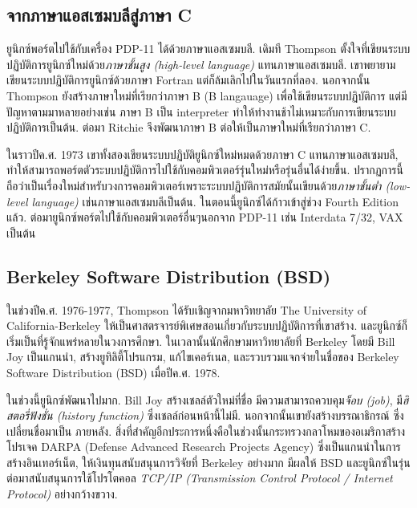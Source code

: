 \begin{thwbr}
{{\subsection{จากภาษาแอสเซมบลีสู่ภาษา C}
ยูนิกซ์พอร์ตไปใช้กับเครื่อง PDP-11 ได้ด้วยภาษาแอสเซมบลี. เดิมที Thompson ตั้งใจที่เขียนระบบปฏิบัติการยูนิกซ์ใหม่ด้วย{\em ภาษาชั้นสูง (high-level language)} แทนภาษาแอสเซมบลี. เขาพยายามเขียนระบบปฏิบัติการยูนิกซ์ด้วยภาษา Fortran แต่ก็ล้มเลิกไปในวันแรกที่ลอง. นอกจากนั้น Thompson ยังสร้างภาษาใหม่ที่เรียกว่าภาษา  B (B langauage) เพื่อใช้เขียนระบบปฏิบัติการ แต่มีปัญหาตามมาหลายอย่างเช่น ภาษา B เป็น interpreter ทำให้ทำงานช้าไม่เหมาะกับการเขียนระบบปฏิบัติการเป็นต้น. ต่อมา Ritchie จึงพัฒนาภาษา B ต่อให้เป็นภาษาใหม่ที่เรียกว่าภาษา C. 

ในราวปีค.ศ. 1973 เขาทั้งสองเขียนระบบปฏิบัติยูนิกซ์ใหม่หมดด้วยภาษา C แทนภาษาแอสเซมบลี, ทำให้สามารถพอร์ตตัวระบบปฏิบัติการไปใช้กับคอมพิวเตอร์รุ่นใหม่หรือรุ่นอื่นได้ง่ายขึ้น. ปรากฏการนี้ถือว่าเป็นเรื่องใหม่สำหรับวงการคอมพิวเตอร์เพราะระบบปฏิบัติการสมัยนั้นเขียนด้วย{\em ภาษาชั้นต่ำ (low-level language)} เช่นภาษาแอสเซมบลีเป็นต้น. ในตอนนี้ยูนิกซ์ได้ก้าวเข้าสู่ช่วง Fourth Edition แล้ว. ต่อมายูนิกซ์พอร์ตไปใช้กับคอมพิวเตอร์อื่นๆนอกจาก PDP-11 เช่น Interdata 7/32, VAX เป็นต้น

\subsection{Berkeley Software Distribution (BSD)}
ในช่วงปีค.ศ. 1976-1977, Thompson ได้รับเชิญจากมหาวิทยาลัย The University of California-Berkeley ให้เป็นศาสตรจารย์พิเศษสอนเกี่ยวกับระบบปฏิบัติการที่เขาสร้าง. และยูนิกซ์ก็เริ่มเป็นที่รู้จักแพร่หลายในวงการศึกษา. ในเวลานั้นนักศึกษามหาวิทยาลัยที่ Berkeley โดยมี Bill Joy เป็นแกนนำ, สร้างยูทิลิตี้โปรแกรม, แก้ไขเคอร์เนล, และรวบรวมแจกจ่ายในชื่อของ Berkeley Software Distribution (BSD) เมื่อปีค.ศ. 1978. 

ในช่วงนี้ยูนิกซ์พัฒนาไปมาก. Bill Joy สร้างเชลล์ตัวใหม่ที่ชื่อ  มีความสามารถควบคุม{\em จ็อบ (job)}, มี{\em ฮิสตอรี่ฟังชั่น (history function)} ซึ่งเชลล์ก่อนหน้านี้ไม่มี. นอกจากนั้นเขายังสร้างบรรณาธิกรณ์  ซึ่งเปลี่ยนชื่อมาเป็น  ภายหลัง. สิ่งที่สำคัญอีกประการหนึ่งคือในช่วงนั้นกระทรวงกลาโหมของอเมริกาสร้างโปรเจค DARPA (Defense Advanced Research Projects Agency) ซึ่งเป็นแกนนำในการสร้างอินเทอร์เน็ต, ให้เงินทุนสนับสนุนการวิจัยที่ Berkeley อย่างมาก มีผลให้ BSD และยูนิกซ์ในรุ่นต่อมาสนับสนุนการใช้โปรโตคอล {\em TCP/IP (Transmission Control Protocol / Internet Protocol)} อย่างกว้างขวาง.

}}
\end{thwbr}
